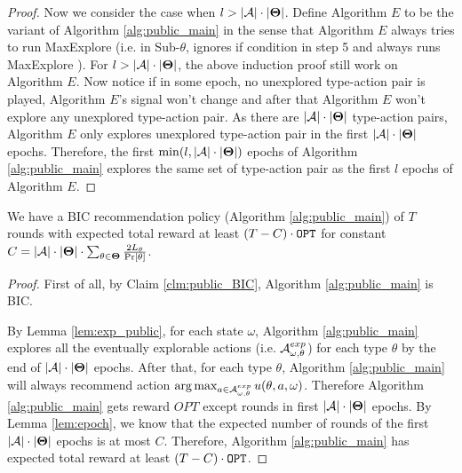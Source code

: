 \begin{proof}
Now we consider the case when $l > |\mathcal{A}| \cdot |\bold{\Theta}|$. Define Algorithm $E$ to be the variant of Algorithm \ref{alg:public_main} in the sense that Algorithm $E$ always tries to run MaxExplore (i.e. in Sub-$\theta$, ignores if condition in step 5 and always runs MaxExplore ). For $l > |\mathcal{A}| \cdot |\bold{\Theta}|$, the above induction proof still work on Algorithm $E$. Now notice if in some epoch, no unexplored type-action pair is played, Algorithm $E$'s signal won't change and after that Algorithm $E$ won't explore any unexplored type-action pair. As there are $ |\mathcal{A}| \cdot |\bold{\Theta}|$ type-action pairs, Algorithm $E$ only explores unexplored type-action pair in the first $ |\mathcal{A}| \cdot |\bold{\Theta}|$ epochs. Therefore, the first $\min(l,|\mathcal{A}|\cdot |\bold{\Theta}|)$ epochs of Algorithm \ref{alg:public_main} explores the same set of type-action pair as the first $l$ epochs of Algorithm $E$.
\end{proof}

\begin{corollary}
\label{cor:public}
We have a BIC recommendation policy (Algorithm \ref{alg:public_main}) of $T$ rounds with expected total reward at least $\left(T - C \right) \cdot \mathtt{OPT}$ for constant $C = |\mathcal{A}| \cdot |\bold{\Theta}| \cdot \sum_{\theta\in\bold{\Theta}} \frac{2L_{\theta}}{\Pr[\theta]}$.
\end{corollary}

\begin{proof}
First of all, by Claim \ref{clm:public_BIC}, Algorithm \ref{alg:public_main} is BIC.

By Lemma \ref{lem:exp_public}, for each state $\omega$, Algorithm \ref{alg:public_main} explores all the eventually explorable actions (i.e. $\mathcal{A}_{\omega,\theta}^{exp}$) for each type $\theta$ by the end of $|\mathcal{A}|\cdot |\bold{\Theta}|$ epochs. After that, for each type $\theta$, Algorithm \ref{alg:public_main} will always recommend action $ \arg\max_{a \in \mathcal{A}_{\omega,\theta}^{exp}} u(\theta, a, \omega)$. Therefore Algorithm \ref{alg:public_main} gets reward $OPT$ except rounds in first $|\mathcal{A}|\cdot |\bold{\Theta}|$ epochs. By Lemma \ref{lem:epoch}, we know that the expected number of rounds of the first  $|\mathcal{A}|\cdot |\bold{\Theta}|$ epochs is at most $C$. Therefore, Algorithm \ref{alg:public_main} has expected total reward at least  $\left(T - C \right) \cdot \mathtt{OPT}$.

\end{proof} 